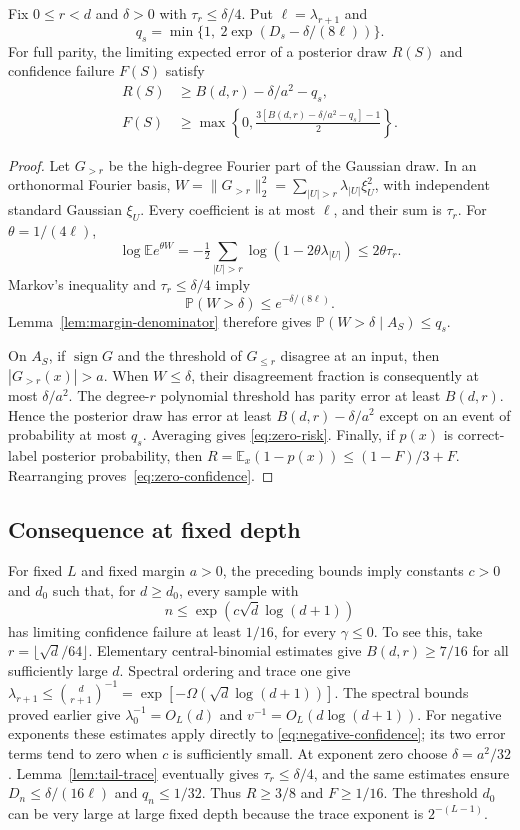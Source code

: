 \begin{theorem}
\label{thm:zero-confidence}
Fix $0\le r<d$ and $\delta>0$ with $\tau_r\le\delta/4$.
Put $\ell=\lambda_{r+1}$ and
\[
 q_s=\min\{1,\ 2\exp(D_s-\delta/(8\ell))\}.
\]
For full parity, the limiting expected error of a posterior draw $R(S)$ and
confidence failure $F(S)$ satisfy
\begin{align}
 R(S)&\ge B(d,r)-\delta/a^2-q_s,\label{eq:zero-risk}\\
 F(S)&\ge\max\left\{0,
       \frac{3[B(d,r)-\delta/a^2-q_s]-1}{2}\right\}.
       \label{eq:zero-confidence}
\end{align}
\end{theorem}
\begin{proof}
Let $G_{>r}$ be the high-degree Fourier part of the Gaussian draw.
In an orthonormal Fourier basis,
$W=\|G_{>r}\|_2^2=\sum_{|U|>r}\lambda_{|U|}\xi_U^2$,
with independent standard Gaussian $\xi_U$.
Every coefficient is at most $\ell$, and their sum is $\tau_r$.
For $\theta=1/(4\ell)$,
\[
 \log\mathbb E e^{\theta W}
 =-\tfrac12\sum_{|U|>r}\log(1-2\theta\lambda_{|U|})
 \le2\theta\tau_r.
\]
Markov's inequality and $\tau_r\le\delta/4$ imply
\[
 \mathbb P(W>\delta)\le e^{-\delta/(8\ell)}.
\]
Lemma~\ref{lem:margin-denominator} therefore gives
$\mathbb P(W>\delta\mid A_S)\le q_s$.

On $A_S$, if $\operatorname{sign}G$ and the threshold of
$G_{\le r}$ disagree at an input, then $|G_{>r}(x)|>a$.
When $W\le\delta$, their disagreement fraction is consequently
at most $\delta/a^2$.  The degree-$r$ polynomial threshold has
parity error at least $B(d,r)$.  Hence the posterior draw has
error at least $B(d,r)-\delta/a^2$ except on an event of
probability at most $q_s$.  Averaging gives
\eqref{eq:zero-risk}.
Finally, if $p(x)$ is correct-label posterior probability, then
$R=\mathbb E_x(1-p(x))\le (1-F)/3+F$.
Rearranging proves~\eqref{eq:zero-confidence}.
\end{proof}

\subsection{Consequence at fixed depth}
For fixed $L$ and fixed margin $a>0$, the preceding bounds imply
constants $c>0$ and $d_0$ such that, for $d\ge d_0$, every sample
with
\[
 n\le\exp(c\sqrt d\log(d+1))
\]
has limiting confidence failure at least $1/16$, for every
$\gamma\le0$.
To see this, take $r=\lfloor\sqrt d/64\rfloor$.
Elementary central-binomial estimates give $B(d,r)\ge7/16$ for
all sufficiently large $d$.  Spectral ordering and trace one give
$\lambda_{r+1}\le\binom d{r+1}^{-1}
=\exp[-\Omega(\sqrt d\log(d+1))]$.
The spectral bounds proved earlier give
$\lambda_0^{-1}=O_L(d)$ and $v^{-1}=O_L(d\log(d+1))$.
For negative exponents these estimates apply directly to
\eqref{eq:negative-confidence}; its two error terms tend to zero
when $c$ is sufficiently small.
At exponent zero choose $\delta=a^2/32$.
Lemma~\ref{lem:tail-trace} eventually gives $\tau_r\le\delta/4$,
and the same estimates ensure $D_n\le\delta/(16\ell)$ and
$q_n\le1/32$.  Thus $R\ge3/8$ and $F\ge1/16$.
The threshold $d_0$ can be very large at large fixed depth because
the trace exponent is $2^{-(L-1)}$.

